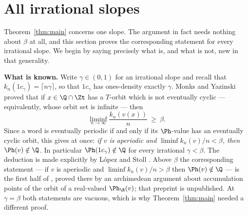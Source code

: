 %
%

\section{All irrational slopes}\label{sec:allslopes}

Theorem~\ref{thm:main} concerns one slope. The argument in fact needs nothing
about $\beta$ at all, and this section proves the corresponding statement for
every irrational slope. We begin by saying precisely what is, and what is not,
new in that generality.

\medskip
\noindent\textbf{What is known.} Write $\gamma\in(0,1)$ for an irrational slope
and recall that $k_n(1c_\gamma)=\lceil n\gamma\rceil$, so that $1c_\gamma$ has
ones-density exactly $\gamma$. Monks and Yazinski
\cite[Theorem~2.7(b)]{MonksYazinski2004} proved that if $x\in\Q\cap\Zt$ has a
$T$-orbit which is not eventually cyclic --- equivalently, whose orbit set is
infinite --- then
\[
\liminf_{n\to\infty}\frac{k_n(v(x))}{n}\ \ge\ \beta .
\]
Since a word is eventually periodic if and only if its $\Ph$-value has an
eventually cyclic orbit, this gives at once: \emph{if $v$ is aperiodic and
$\liminf k_n(v)/n<\beta$, then $\Ph(v)\notin\Q$.} In particular
$\Ph(1c_\gamma)\notin\Q$ for every irrational $\gamma<\beta$. The deduction is
made explicitly by L\'opez and Stoll \cite[p.~6]{LopezStoll2021}. Above $\beta$
the corresponding statement --- if $v$ is aperiodic and $\liminf k_n(v)/n>\beta$
then $\Ph(v)\notin\Q$ --- is the first half of
\cite[Theorem~1]{LopezStoll2021}, proved there by an archimedean argument about
accumulation points of the orbit of a real-valued $\Ph_\R(v)$; that preprint is
unpublished. At $\gamma=\beta$ both statements are vacuous, which is why
Theorem~\ref{thm:main} needed a different proof.

